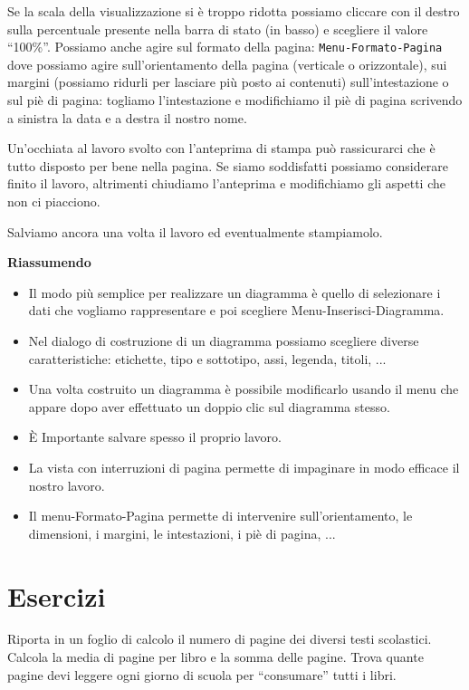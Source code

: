 Se la scala della visualizzazione si è troppo ridotta possiamo cliccare
con il destro sulla percentuale presente nella barra di stato (in basso)
e scegliere il valore ``100\%''. Possiamo anche agire sul formato della pagina:
\texttt{Menu-Formato-Pagina} dove possiamo agire sull'orientamento della pagina
(verticale o orizzontale), sui margini
(possiamo ridurli per lasciare più posto ai contenuti)
sull'intestazione o sul piè di pagina: togliamo l'intestazione e modifichiamo
il piè di pagina scrivendo a sinistra la data e a destra il nostro nome.

Un'occhiata al lavoro svolto con l'anteprima di stampa può rassicurarci che
è tutto disposto per bene nella pagina.
Se siamo soddisfatti possiamo considerare finito il lavoro, altrimenti
chiudiamo l'anteprima e modifichiamo gli aspetti che non ci piacciono.

Salviamo ancora una volta il lavoro ed eventualmente stampiamolo.

\textbf{Riassumendo}

\begin{itemize} [nosep]
\item Il modo più semplice per realizzare un diagramma è quello di selezionare
i dati che vogliamo rappresentare e poi scegliere Menu-Inserisci-Diagramma.
\item Nel dialogo di costruzione di un diagramma possiamo scegliere diverse
caratteristiche: etichette, tipo e sottotipo, assi, legenda, titoli, ...
\item Una volta costruito un diagramma è possibile modificarlo usando il menu
che appare dopo aver effettuato un doppio clic sul diagramma stesso.
\item È Importante salvare spesso il proprio lavoro.
\item La vista con interruzioni di pagina permette di impaginare in modo 
efficace il nostro lavoro.
\item Il menu-Formato-Pagina permette di intervenire sull'orientamento,
le dimensioni, i margini, le intestazioni, i piè di pagina, ...
\end{itemize}

\section{Esercizi}
\label{05_01_f_di_calc:esercizi}

\begin{esercizio}
Riporta in un foglio di calcolo il numero di pagine dei diversi testi
scolastici. Calcola la media di pagine per libro e la somma delle pagine.
Trova quante pagine devi leggere ogni giorno di scuola per
``consumare'' tutti i libri.
\end{esercizio}

